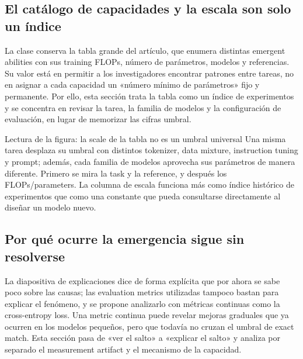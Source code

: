 \subsection{El catálogo de capacidades y la escala son solo un índice}

La clase conserva la tabla grande del artículo, que enumera distintas emergent abilities con sus training FLOPs, número de parámetros, modelos y referencias. Su valor está en permitir a los investigadores encontrar patrones entre tareas, no en asignar a cada capacidad un «número mínimo de parámetros» fijo y permanente. Por ello, esta sección trata la tabla como un índice de experimentos y se concentra en revisar la tarea, la familia de modelos y la configuración de evaluación, en lugar de memorizar las cifras umbral.


\begin{knowledgebox}{Lectura de la figura: la scale de la tabla no es un umbral universal}
Una misma tarea desplaza su umbral con distintos tokenizer, data mixture, instruction tuning y prompt; además, cada familia de modelos aprovecha sus parámetros de manera diferente. Primero se mira la task y la reference, y después los FLOPs/parameters. La columna de escala funciona más como índice histórico de experimentos que como una constante que pueda consultarse directamente al diseñar un modelo nuevo.
\end{knowledgebox}

\subsection{Por qué ocurre la emergencia sigue sin resolverse}

La diapositiva de explicaciones dice de forma explícita que por ahora se sabe poco sobre las causas; las evaluation metrics utilizadas tampoco bastan para explicar el fenómeno, y se propone analizarlo con métricas continuas como la cross-entropy loss. Una metric continua puede revelar mejoras graduales que ya ocurren en los modelos pequeños, pero que todavía no cruzan el umbral de exact match. Esta sección pasa de «ver el salto» a «explicar el salto» y analiza por separado el measurement artifact y el mecanismo de la capacidad.


